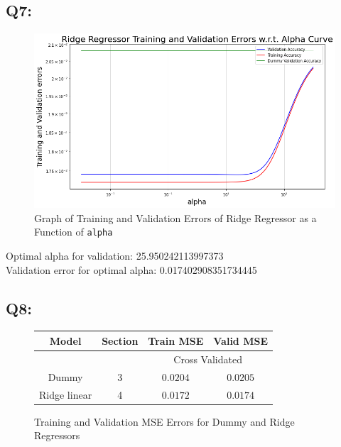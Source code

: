 \documentclass{article}
\newcommand{\code}[1]{\texttt{#1}}
\begin{document}
\subsection*{Q7:}
    \begin{figure}[H]
        \centering
        \includegraphics[scale=0.5]{q7.png}
        \caption{Graph of Training and Validation Errors of Ridge Regressor as a Function of \code{alpha}}
        \label{fig:q7}
    \end{figure}
    Optimal alpha for validation: 25.950242113997373\\
    Validation error for optimal alpha: 0.017402908351734445

\subsection*{Q8:}
    \begin{figure}[H]
        \centering
        \begin{tabular}{|c|c|c|c|}
            \hline
            \rowcolor{gray!60}
            Model & Section & Train MSE & Valid MSE\\ \hline
            \rowcolor{gray!20}
            ~&~ & \multicolumn{2}{c|}{Cross Validated}\\ \hline
            Dummy & 3 & $0.0204$ & $0.0205$\\ \hline
            Ridge linear & 4 & $0.0172$ & $0.0174$\\ \hline
        \end{tabular}
        \caption{Training and Validation MSE Errors for Dummy and Ridge Regressors}
    \end{figure}
\end{document}
